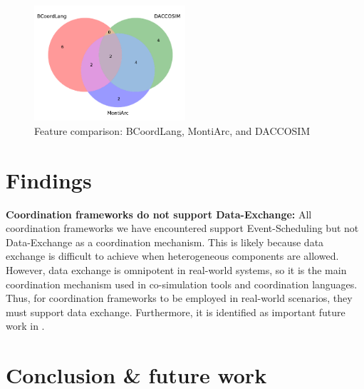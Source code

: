 \documentclass[runningheads]{llncs}
\begin{document}
\begin{figure}[ht]
	\centering
	\includegraphics[width=0.5\textwidth]{images/venn_daccosim}
	\caption{Feature comparison: BCoordLang, MontiArc, and DACCOSIM}
	\label{fig:venn-DACCOSIM}
\end{figure}


\section{Findings} \label{sec:findings}






\textbf{Coordination frameworks do not support Data-Exchange:} All coordination frameworks we have encountered support \textsf{Event-Scheduling} but not \textsf{Data-Exchange} as a coordination mechanism.
This is likely because data exchange is difficult to achieve when heterogeneous components are allowed.
However, data exchange is omnipotent in real-world systems, so it is the main coordination mechanism used in co-simulation tools and coordination languages.
Thus, for coordination frameworks to be employed in real-world scenarios, they must support data exchange.
Furthermore, it is identified as important future work in \cite{krauterBehavioralConsistencyMultimodeling2023,varalarsenBCOolBehavioralCoordination2016}.

\section{Conclusion \& future work} \label{sec:conclusion}



\end{document}
